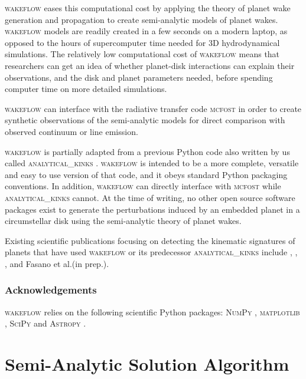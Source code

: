 \textsc{wakeflow} eases this computational cost by applying the theory of planet wake generation and propagation \citep{goldreich1979,goodman2001,rafikov2002a,bollati2021} to create semi-analytic models of planet wakes. 
\textsc{wakeflow} models are readily created in a few seconds on a modern laptop, as opposed to the hours of supercomputer time needed for 3D hydrodynamical simulations. 
The relatively low computational cost of \textsc{wakeflow} means that researchers can get an idea of whether planet-disk interactions can explain their observations, and the disk and planet parameters needed, before spending computer time on more detailed simulations.

\textsc{wakeflow} can interface with the radiative transfer code \textsc{mcfost} \citep{pinte2006,pinte2009} in order to create synthetic observations of the semi-analytic models for direct comparison with observed continuum or line emission.

\textsc{wakeflow} is partially adapted from a previous Python code also written by us called \textsc{analytical\_kinks} \citep{bollati2021a}. 
\textsc{wakeflow} is intended to be a more complete, versatile and easy to use version of that code, and it obeys standard Python packaging conventions.
In addition, \textsc{wakeflow} can directly interface with \textsc{mcfost} while \textsc{analytical\_kinks} cannot.
At the time of writing, no other open source software packages exist to generate the perturbations induced by an embedded planet in a circumstellar disk using the semi-analytic theory of planet wakes.

Existing scientific publications focusing on detecting the kinematic signatures of planets that have used \textsc{wakeflow} or its predecessor \textsc{analytical\_kinks} include \citet{bollati2021}, \citet{calcino2022}, \citet{teague2022}, \citet{garg2022} and Fasano et al.(in prep.).

\subsubsection{Acknowledgements}

\textsc{wakeflow} relies on the following scientific Python packages: \textsc{NumPy} \citep{harris2020}, \textsc{matplotlib} \citep{hunter2007}, \textsc{SciPy} \citep{virtanen2020} and \textsc{Astropy} \citep{astropycollaboration2022}.

\section{Semi-Analytic Solution Algorithm}

